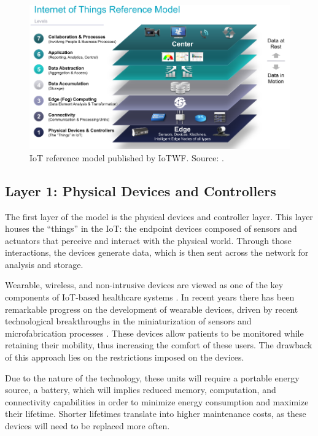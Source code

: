 \begin{figure}[H]
    \centering
    \includegraphics[width=0.85\linewidth]{images/iotwf-referencemodel.png}
    \caption[IoT reference model published by IoTWF.]{IoT reference model published by IoTWF. Source: \cite{Cisco2014}.}
    \label{fig:iotwf-referencemodel}
\end{figure}

\subsection{Layer 1: Physical Devices and Controllers}
\label{sec:iot-model-layer1}

The first layer of the model is the physical devices and controller layer. This layer houses the ``things'' in the \acl{IoT}: the endpoint devices composed of sensors and actuators that perceive and interact with the physical world. Through those interactions, the devices generate data, which is then sent across the network for analysis and storage. \bigskip

Wearable, wireless, and non-intrusive devices are viewed as one of the key components of \acs{IoT}-based healthcare systems \cite{Baker2017}. In recent years there has been remarkable progress on the development of wearable devices, driven by recent technological breakthroughs in the miniaturization of sensors and microfabrication processes \cite{Adame2018, Catarinucci2015}. These devices allow patients to be monitored while retaining their mobility, thus increasing the comfort of these users. The drawback of this approach lies on the restrictions imposed on the devices.\bigskip 

Due to the nature of the technology, these units will require a portable energy source, a battery, which will implies reduced memory, computation, and connectivity capabilities in order to minimize energy consumption and maximize their lifetime. Shorter lifetimes translate into higher maintenance costs, as these devices will need to be replaced more often. \bigskip

